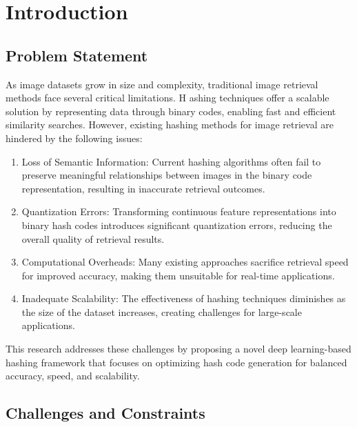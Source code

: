 \documentclass[conference]{IEEEtran}
\begin{document}
\section{Introduction}

\subsection{Problem Statement}
As image datasets grow in size and complexity, traditional image retrieval methods face several critical limitations. H
ashing techniques offer a scalable solution by representing data through binary codes, enabling fast and efficient similarity searches. However, existing hashing methods for image retrieval are hindered by the following issues:

\begin{enumerate}
    \item Loss of Semantic Information: Current hashing algorithms often fail to preserve meaningful relationships between images in the binary code representation, resulting in inaccurate retrieval outcomes.
    \item Quantization Errors: Transforming continuous feature representations into binary hash codes introduces significant quantization errors, reducing the overall quality of retrieval results.
    \item Computational Overheads: Many existing approaches sacrifice retrieval speed for improved accuracy, making them unsuitable for real-time applications.
    \item Inadequate Scalability: The effectiveness of hashing techniques diminishes as the size of the dataset increases, creating challenges for large-scale applications.
    
\end{enumerate}

This research addresses these challenges by proposing a novel deep learning-based hashing framework that focuses on optimizing hash code generation for balanced accuracy, speed, and scalability.

\subsection{Challenges and Constraints}
\end{document}
